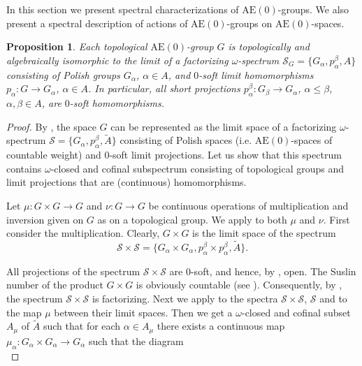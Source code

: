 \documentclass[12pt,draft]{amsart}
\theoremstyle{plain}
\newtheorem{pro}[thm]{Proposition}
\theoremstyle{definition}
\numberwithin{equation}{section}
\begin{document}
In this section we present spectral characterizations of
$\text{AE}(0)$-groups. We also present a spectral description
of actions of $\text{AE}(0)$-groups on $\text{AE}(0)$-spaces. 

\begin{pro}\label{P:B8.2.1}
Each  topological $\text{AE}(0)$-group $G$ is topologically
and algebraically isomorphic to the limit of a factorizing
$\omega$-spectrum ${\mathcal S}_{G} = \{ G_{\alpha},
p_{\alpha}^{\beta}, A\}$
consisting of Polish groups $G_{\alpha}$, $\alpha \in A$, and $0$-soft
limit homomorphisms $p_{\alpha} \colon G \to G_{\alpha}$, $\alpha \in A$.
In particular, all short projections
$p_{\alpha}^{\beta} \colon G_{\beta} \to G_{\alpha}$,
$\alpha \leq \beta$, $\alpha ,\beta \in A$, are $0$-soft homomorphisms.
\end{pro}
\begin{proof}
By \cite[Theorem 6.3.2 or Proposition 6.3.5]{chibook96},
the space $G$ can be
represented as the limit space of a factorizing $\omega$-spectrum
${\mathcal S} = \{ G_{\alpha}, p_{\alpha}^{\beta}, \widetilde{A}\}$
consisting
of Polish spaces (i.e. $\text{AE}(0)$-spaces of countable weight)
and $0$-soft limit
projections. Let us show that this spectrum contains
$\omega$-closed and cofinal subspectrum consisting of
topological groups and limit projections that are
(continuous) homomorphisms. 

Let $\mu \colon G \times G \to G$ and $\nu \colon G \to G$ be
continuous operations of multiplication and inversion given on
$G$ as on a topological group. We apply \cite[Theorem 1.3.6]{chibook96} to
both $\mu$ and $\nu$. First consider the multiplication.
Clearly, $G \times G$ is the limit space
of the spectrum\\
\[ {\mathcal S} \times {\mathcal S} =
\{ G_{\alpha} \times G_{\alpha}, p_{\alpha}^{\beta}
\times p_{\alpha}^{\beta}, \widetilde{A} \} .\]

\noindent All projections of the spectrum
${\mathcal S} \times {\mathcal S}$ are $0$-soft, and hence,
by \cite[Proposition 6.1.26]{chibook96}, open. The Suslin number
of the product $G \times G$ is obviously countable
(see \cite[proposition 6.1.8]{chibook96}). Consequently,
by \cite[Proposition 1.3.3]{chibook96}, the spectrum
${\mathcal S} \times {\mathcal S}$ is factorizing. Next
we apply \cite[Theorem 1.3.6]{chibook96} to the spectra
${\mathcal S} \times {\mathcal S}$, $\mathcal S$ and to the
map $\mu$ between their limit spaces. Then we get a
$\omega$-closed and cofinal subset $A_{\mu}$ of $\widetilde{A}$
such that for
each $\alpha \in A_{\mu}$ there exists a continuous map
$\mu _{\alpha} \colon G_{\alpha} \times G_{\alpha} \to G_{\alpha}$
such that the diagram\\


\end{proof}
\end{document}
